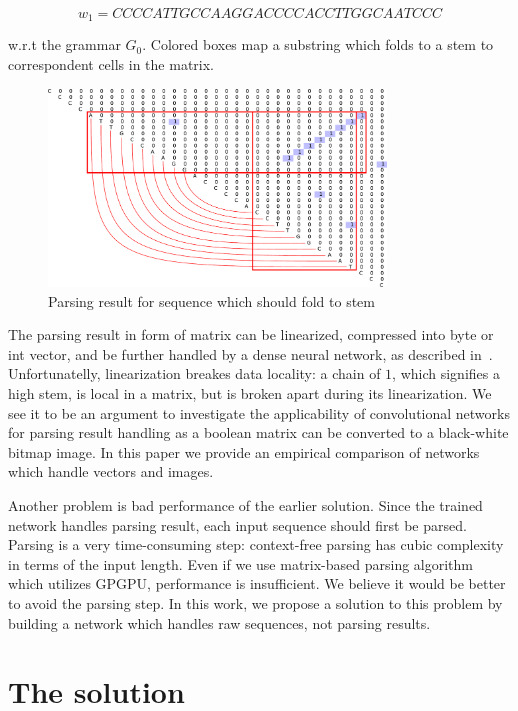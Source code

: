 \documentclass[12pt,a4paper]{cibb}
\begin{document}
\[
w_1 = CCCCATTGCCAAGGACCCCACCTTGGCAATCCC
\]

w.r.t the grammar $G_0$.
Colored boxes map a substring which folds to a stem to correspondent cells in the matrix.

\begin{figure}[h]
\begin{center}
\centering
\includegraphics[width=0.8\textwidth]{figures/4.pdf}
\caption{Parsing result for sequence which should fold to
stem}
\label{fig:example}
\end{center}
\end{figure}

The parsing result in form of matrix can be linearized, compressed into byte or int vector, and be further handled by a dense neural network, as described in~\cite{grigorevcomposition}.
Unfortunatelly, linearization breakes data locality: a chain of $1$, which signifies a high stem, is local in a matrix, but is broken apart during its linearization.
We see it to be an argument to investigate the applicability of convolutional networks for parsing result handling as a boolean matrix can be converted to a black-white bitmap image.
In this paper we provide an empirical comparison of networks which handle vectors and images.

Another problem is bad performance of the earlier solution.
Since the trained network handles parsing result, each input sequence should first be parsed.
Parsing is a very time-consuming step: context-free parsing has cubic complexity in terms of the input length.
Even if we use matrix-based parsing algorithm~\cite{Azimov:2018:CPQ:3210259.3210264} which utilizes GPGPU, performance is insufficient.
We believe it would be better to avoid the parsing step.
In this work, we propose a solution to this problem by building a network which handles raw sequences, not parsing results.

\section{\bf The solution}
\end{document}
